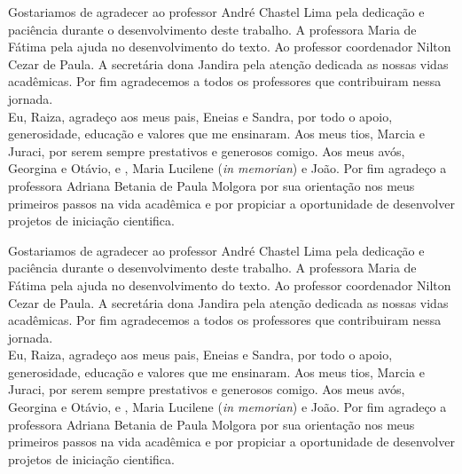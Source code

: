 \normalsize{Gostariamos de agradecer ao professor André Chastel Lima pela dedicação e paciência  durante o desenvolvimento deste trabalho. A professora Maria de Fátima pela ajuda no desenvolvimento do texto. Ao professor coordenador Nilton Cezar de Paula. A secretária dona Jandira pela atenção dedicada as nossas vidas acadêmicas. Por fim agradecemos a todos os professores que contribuiram nessa jornada.\\

\quad Eu, Raiza, agradeço aos meus pais, Eneias e Sandra, por todo o apoio, generosidade, educação e valores que me ensinaram. Aos meus tios, Marcia e Juraci, por serem sempre prestativos e generosos comigo. Aos meus avós, Georgina e Otávio, e , Maria Lucilene (\textit{in memorian}) e João. Por fim agradeço a professora Adriana Betania de Paula Molgora por sua orientação nos meus primeiros passos na vida acadêmica e por propiciar a oportunidade de desenvolver projetos de iniciação cientifica.  


Gostariamos de agradecer ao professor André Chastel Lima pela dedicação e paciência  durante o desenvolvimento deste trabalho. A professora Maria de Fátima pela ajuda no desenvolvimento do texto. Ao professor coordenador Nilton Cezar de Paula. A secretária dona Jandira pela atenção dedicada as nossas vidas acadêmicas. Por fim agradecemos a todos os professores que contribuiram nessa jornada.\\

\quad Eu, Raiza, agradeço aos meus pais, Eneias e Sandra, por todo o apoio, generosidade, educação e valores que me ensinaram. Aos meus tios, Marcia e Juraci, por serem sempre prestativos e generosos comigo. Aos meus avós, Georgina e Otávio, e , Maria Lucilene (\textit{in memorian}) e João. Por fim agradeço a professora Adriana Betania de Paula Molgora por sua orientação nos meus primeiros passos na vida acadêmica e por propiciar a oportunidade de desenvolver projetos de iniciação cientifica.  


}